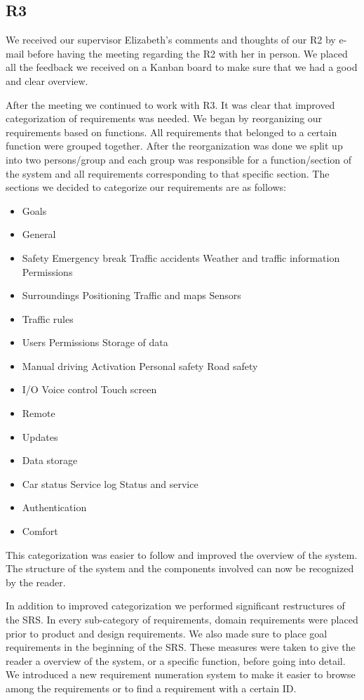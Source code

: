 \documentclass[10pt]{article}
\begin{document}
\subsection{R3}
We received our supervisor Elizabeth's comments and thoughts of our R2 by e-mail before having the meeting regarding the R2 with her in person. We placed all the feedback we received on a Kanban board to make sure that we had a good and clear overview.

After the meeting we continued to work with R3. It was clear that improved categorization of requirements was needed. We began by reorganizing our requirements based on functions. All requirements that belonged to a certain function were grouped together. After the reorganization was done we split up into two persons/group and each group was responsible for a function/section of the system and all requirements corresponding to that specific section. 
The sections we decided to categorize our requirements are as follows:
\begin{itemize}
\item Goals
\item General
\item Safety
\subitem Emergency break
\subitem Traffic accidents
\subitem Weather and traffic information
\subitem Permissions
\item Surroundings
\subitem Positioning
\subitem Traffic and maps
\subitem Sensors
\item Traffic rules
\item Users
\subitem Permissions
\subitem Storage of data
\item Manual driving
\subitem Activation
\subitem Personal safety
\subitem Road safety
\item I/O
\subitem Voice control
\subitem Touch screen
\item Remote
\item Updates
\item Data storage
\item Car status
\subitem Service log
\subitem Status and service
\item Authentication
\item Comfort
\end{itemize}
This categorization was easier to follow and improved the overview of the system. The structure of the system and the components involved can now be recognized by the reader. 

In addition to improved categorization we performed significant restructures of the SRS. In every sub-category of requirements, domain requirements were placed prior to product and design requirements. We also made sure to place goal requirements in the beginning of the SRS. These measures were taken to give the reader a overview of the system, or a specific function, before going into detail.
We introduced a new requirement numeration system to make it easier to browse among the requirements or to find a requirement with a certain ID.
\end{document}
